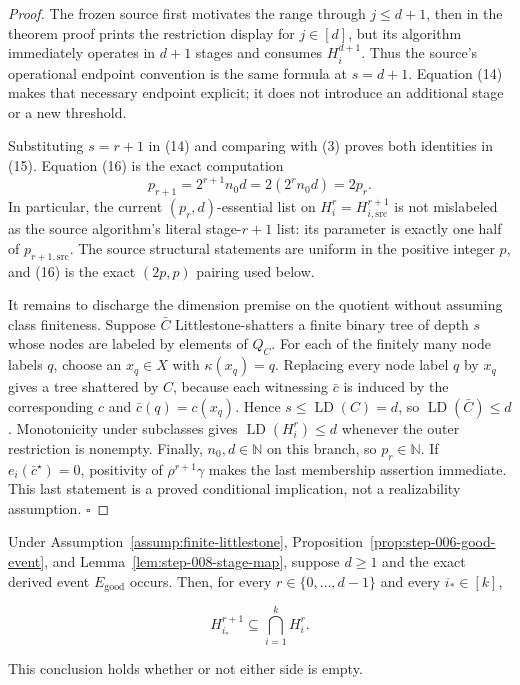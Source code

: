 \begin{proof}
The frozen source first motivates the range through \(j\le d+1\), then in
the theorem proof prints the restriction display for \(j\in[d]\), but its
algorithm immediately operates in \(d+1\) stages and consumes
\(H_i^{d+1}\). Thus the source's operational endpoint convention is the
same formula at \(s=d+1\). Equation (14) makes that necessary endpoint
explicit; it does not introduce an additional stage or a new threshold.

Substituting \(s=r+1\) in (14) and comparing with (3) proves both identities
in (15). Equation (16) is the exact computation
\[
 p_{r+1}=2^{r+1}n_0d=2(2^rn_0d)=2p_r.
\]
In particular, the current \((p_r,d)\)-essential list on
\(H_i^r=H_{i,\mathrm{src}}^{r+1}\) is not mislabeled as the source
algorithm's literal stage-\(r+1\) list: its parameter is exactly one half
of \(p_{r+1,\mathrm{src}}\). The source structural statements are uniform
in the positive integer \(p\), and (16) is the exact \((2p,p)\) pairing
used below.

It remains to discharge the dimension premise on the quotient without
assuming class finiteness. Suppose \(\bar C\) Littlestone-shatters a finite
binary tree of depth \(s\) whose nodes are labeled by elements of \(Q_C\).
For each of the finitely many node labels \(q\), choose an
\(x_q\in X\) with \(\kappa(x_q)=q\). Replacing every node label \(q\) by
\(x_q\) gives a tree shattered by \(C\), because each witnessing
\(\bar c\) is induced by the corresponding \(c\) and
\(\bar c(q)=c(x_q)\). Hence \(s\le\operatorname{LD}(C)=d\), so
\(\operatorname{LD}(\bar C)\le d\). Monotonicity under subclasses gives
\(\operatorname{LD}(H_i^r)\le d\) whenever the outer restriction is
nonempty. Finally, \(n_0,d\in\mathbb N\) on this branch, so \(p_r\in
\mathbb N\). If \(e_i(\bar c^\star)=0\), positivity of
\(\rho^{r+1}\gamma\) makes the last membership assertion immediate. This
last statement is a proved conditional implication, not a realizability
assumption. \(\square\)


\end{proof}

\begin{proposition}\label{prop:step-008-inclusion}
Under Assumption~\ref{assump:finite-littlestone}, Proposition~\ref{prop:step-006-good-event}, and
Lemma~\ref{lem:step-008-stage-map}, suppose \(d\ge1\) and the exact derived
event \(E_{\mathrm{good}}\) occurs. Then, for every
\(r\in\{0,\ldots,d-1\}\) and every \(i_*\in[k]\),

\[
 H_{i_*}^{r+1}\subseteq\bigcap_{i=1}^k H_i^r.
\tag{17}
\]

This conclusion holds whether or not either side is empty.


\end{proposition}

